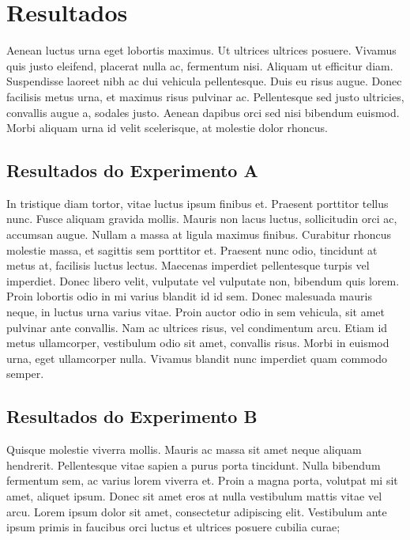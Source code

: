 \chapter{Resultados}
\label{chap:resultados}

Aenean luctus urna eget lobortis maximus. Ut ultrices ultrices posuere. Vivamus quis justo eleifend, placerat nulla ac, fermentum nisi. Aliquam ut efficitur diam. Suspendisse laoreet nibh ac dui vehicula pellentesque. Duis eu risus augue. Donec facilisis metus urna, et maximus risus pulvinar ac. Pellentesque sed justo ultricies, convallis augue a, sodales justo. Aenean dapibus orci sed nisi bibendum euismod. Morbi aliquam urna id velit scelerisque, at molestie dolor rhoncus.

\section{Resultados do Experimento A}
\label{sec:resultados-do-experimento-a}

In tristique diam tortor, vitae luctus ipsum finibus et. Praesent porttitor tellus nunc. Fusce aliquam gravida mollis. Mauris non lacus luctus, sollicitudin orci ac, accumsan augue. Nullam a massa at ligula maximus finibus. Curabitur rhoncus molestie massa, et sagittis sem porttitor et. Praesent nunc odio, tincidunt at metus at, facilisis luctus lectus. Maecenas imperdiet pellentesque turpis vel imperdiet. Donec libero velit, vulputate vel vulputate non, bibendum quis lorem. Proin lobortis odio in mi varius blandit id id sem. Donec malesuada mauris neque, in luctus urna varius vitae. Proin auctor odio in sem vehicula, sit amet pulvinar ante convallis. Nam ac ultrices risus, vel condimentum arcu. Etiam id metus ullamcorper, vestibulum odio sit amet, convallis risus. Morbi in euismod urna, eget ullamcorper nulla. Vivamus blandit nunc imperdiet quam commodo semper.

\section{Resultados do Experimento B}
\label{sec:resultados-do-experimento-b}

Quisque molestie viverra mollis. Mauris ac massa sit amet neque aliquam hendrerit. Pellentesque vitae sapien a purus porta tincidunt. Nulla bibendum fermentum sem, ac varius lorem viverra et. Proin a magna porta, volutpat mi sit amet, aliquet ipsum. Donec sit amet eros at nulla vestibulum mattis vitae vel arcu. Lorem ipsum dolor sit amet, consectetur adipiscing elit. Vestibulum ante ipsum primis in faucibus orci luctus et ultrices posuere cubilia curae;